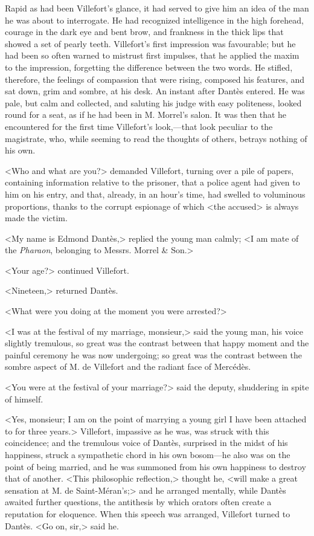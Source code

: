  Rapid as had been Villefort's glance, it had served to give him an idea of the man he was about to interrogate. He had recognized intelligence in the high forehead, courage in the dark eye and bent brow, and frankness in the thick lips that showed a set of pearly teeth. Villefort's first impression was favourable; but he had been so often warned to mistrust first impulses, that he applied the maxim to the impression, forgetting the difference between the two words. He stifled, therefore, the feelings of compassion that were rising, composed his features, and sat down, grim and sombre, at his desk. An instant after Dantès entered. He was pale, but calm and collected, and saluting his judge with easy politeness, looked round for a seat, as if he had been in M. Morrel's salon. It was then that he encountered for the first time Villefort's look,—that look peculiar to the magistrate, who, while seeming to read the thoughts of others, betrays nothing of his own. 

 <Who and what are you?> demanded Villefort, turning over a pile of papers, containing information relative to the prisoner, that a police agent had given to him on his entry, and that, already, in an hour's time, had swelled to voluminous proportions, thanks to the corrupt espionage of which <the accused> is always made the victim. 

 <My name is Edmond Dantès,> replied the young man calmly; <I am mate of the \textit{Pharaon}, belonging to Messrs. Morrel \& Son.> 

 <Your age?> continued Villefort. 

 <Nineteen,> returned Dantès. 

 <What were you doing at the moment you were arrested?> 

 <I was at the festival of my marriage, monsieur,> said the young man, his voice slightly tremulous, so great was the contrast between that happy moment and the painful ceremony he was now undergoing; so great was the contrast between the sombre aspect of M. de Villefort and the radiant face of Mercédès. 

 <You were at the festival of your marriage?> said the deputy, shuddering in spite of himself. 

 <Yes, monsieur; I am on the point of marrying a young girl I have been attached to for three years.> Villefort, impassive as he was, was struck with this coincidence; and the tremulous voice of Dantès, surprised in the midst of his happiness, struck a sympathetic chord in his own bosom—he also was on the point of being married, and he was summoned from his own happiness to destroy that of another. <This philosophic reflection,> thought he, <will make a great sensation at M. de Saint-Méran's;> and he arranged mentally, while Dantès awaited further questions, the antithesis by which orators often create a reputation for eloquence. When this speech was arranged, Villefort turned to Dantès.  <Go on, sir,> said he. 

